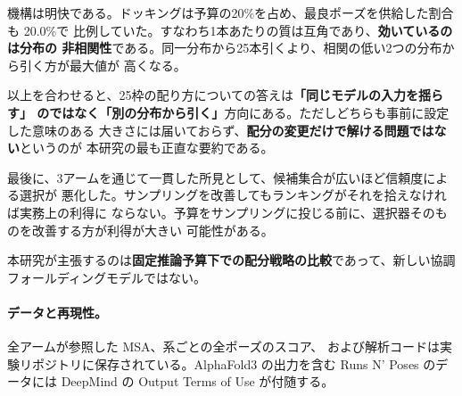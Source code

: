 \documentclass[11pt]{article}
\begin{document}
機構は明快である。ドッキングは予算の20\%を占め、最良ポーズを供給した割合も 20.0\%で
比例していた。すなわち1本あたりの質は互角であり、\textbf{効いているのは分布の
非相関性}である。同一分布から25本引くより、相関の低い2つの分布から引く方が最大値が
高くなる。

以上を合わせると、25枠の配り方についての答えは\textbf{「同じモデルの入力を揺らす」
のではなく「別の分布から引く」}方向にある。ただしどちらも事前に設定した意味のある
大きさには届いておらず、\textbf{配分の変更だけで解ける問題ではない}というのが
本研究の最も正直な要約である。

最後に、3アームを通じて一貫した所見として、候補集合が広いほど信頼度による選択が
悪化した。サンプリングを改善してもランキングがそれを拾えなければ実務上の利得に
ならない。予算をサンプリングに投じる前に、選択器そのものを改善する方が利得が大きい
可能性がある。

本研究が主張するのは\textbf{固定推論予算下での配分戦略の比較}であって、新しい協調
フォールディングモデルではない。

\paragraph{データと再現性。}全アームが参照した MSA、系ごとの全ポーズのスコア、
および解析コードは実験リポジトリに保存されている。AlphaFold3 の出力を含む
Runs N' Poses のデータには DeepMind の Output Terms of Use が付随する。


\end{document}
